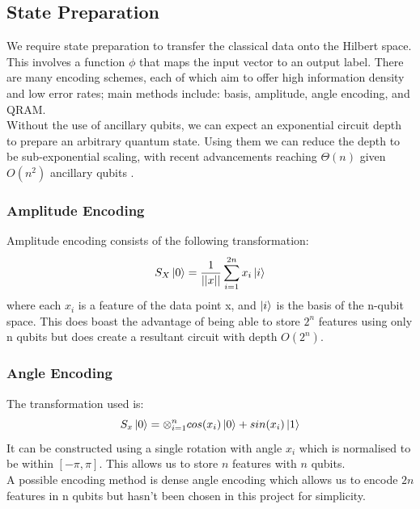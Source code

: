 \documentclass[12pt]{article}
\numberwithin{equation}{section}
\begin{document}
\subsection{State Preparation}
We require state preparation to transfer the classical data onto the 
Hilbert space. This involves a function $\phi$ that maps the input vector to 
an output label. There are many encoding schemes, each of which aim to offer 
high information density and low error rates; main methods include: basis, amplitude, angle encoding, and QRAM. 
\\
Without the use of ancillary qubits, we can expect an exponential circuit depth
to prepare an arbitrary quantum state. Using them we can reduce the depth to be 
sub-exponential scaling, with recent advancements reaching $\Theta(n)$ given $O(n^2)$
ancillary qubits
\cite{shaib_efficient_2023,zhang_quantum_2022}.


\subsubsection{Amplitude Encoding}
Amplitude encoding consists of the following transformation:\\
\begin{equation}
S_X \ket{0} = \frac{1}{||x||}\sum^{2n}_{i=1}{x_i\ket{i}}
\end{equation}
where each $x_i$ is a feature of the data point x, and $\ket{i}$ is the basis 
of the n-qubit
space. This does boast the advantage of being able to store $2^n$ features using 
only n qubits but does create a resultant circuit with depth $O(2^n)$.

\subsubsection{Angle Encoding}
The transformation used is:
\begin{equation}
S_x\ket{0} = \otimes^n_{i=1} cos(x_i)\ket{0} + sin(x_i)\ket{1}
\end{equation}
It can be constructed using a single rotation with angle $x_i$ which is 
normalised to be within $[-\pi,\pi]$. This allows us to store $n$ features with 
$n$ qubits.
\\
A possible encoding method is dense angle encoding which allows us to encode $2n$ 
features in n qubits but hasn't been chosen in this project for simplicity.
\end{document}
